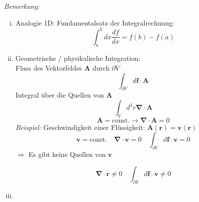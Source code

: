 \documentclass[titlepage,11pt,a4paper,ngerman]{report}
\newcommand{\tx}[1]{\textrm{#1}}
\newcommand{\const}{\tx{const.}}
\renewcommand{\vec}[1]{\boldsymbol{#1}}
\begin{document}
\noindent
\emph{Bemerkung:}\\
\begin{enumerate}[i)]
	\item Analogie 1D: Fundamentalsatz der Integralrechnung:
	\begin{equation*}
	\int_{a}^{b} dx \frac{df}{dx} = f(b) - f(a)
	\end{equation*}
	\item Geometrische / physikalische Integration:\\
	Fluss des Vektorfeldes $ \vec{A} $ durch $ \partial V $
	\begin{equation*}
	\int_{\partial V} d\vec{f} \cdot \vec{A}
	\end{equation*}
	Integral über die Quellen von $ \vec{A} $
	\begin{equation*}
	\int_V d^3r \vec{\nabla} \cdot \vec{A}
	\end{equation*}
	\begin{equation*}
	\vec{A} = \const \rightarrow \vec{\nabla} \cdot \vec{A} = 0
	\end{equation*}
	\emph{Beispiel:} Geschwindigkeit einer Flüssigkeit: $ \vec{A}(\vec{r}) = \vec{v}(\vec{r}) $\\
	
	
	$$ \vec{v} = \const \quad \vec{\nabla} \cdot \vec{v} = 0 \quad \int_{\partial V} d\vec{f} \cdot \vec{v} = 0 $$
	$ \Rightarrow $ Es gibt keine Quellen von $ \vec{v} $
	
	
	$$ \vec{\nabla} \cdot \vec{r} \neq 0 \quad \int_{\partial V} d\vec{f} \cdot \vec{v} \neq 0 $$
	\item
	
	

\end{enumerate}
\end{document}
